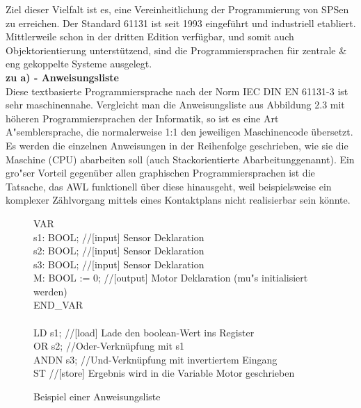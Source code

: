	Ziel dieser Vielfalt ist es, eine Vereinheitlichung der Programmierung von SPSen zu erreichen. Der Standard 61131 ist seit 1993 eingeführt und industriell etabliert. Mittlerweile schon in der dritten Edition verfügbar, und somit auch Objektorientierung unterstützend, sind die Programmiersprachen für zentrale \& eng gekoppelte Systeme ausgelegt.\\
	
	\textbf{zu a) - Anweisungsliste}\\
	
	Diese textbasierte Programmiersprache nach der Norm IEC DIN EN 61131-3 ist sehr maschinennahe. Vergleicht man die Anweisungsliste aus Abbildung 2.3 mit höheren Programmiersprachen der Informatik, so ist es eine Art A"semblersprache, die normalerweise 1:1 den jeweiligen Maschinencode übersetzt. Es werden die einzelnen Anweisungen in der Reihenfolge geschrieben, wie sie die Maschine (CPU) abarbeiten soll (auch \glqq Stackorientierte Abarbeitung\grqq \space genannt). Ein gro"ser Vorteil gegenüber allen graphischen Programmiersprachen ist die Tatsache, das AWL funktionell über diese hinausgeht, weil beispielsweise ein komplexer Zählvorgang mittels eines Kontaktplans nicht realisierbar sein könnte.	\cite{spslehrgang_struktur, egroetsch_sps}\\

	\begin{figure}[h!]
		\begin{framed}
			VAR\\
			s1: BOOL; \color{gray}//[input] Sensor Deklaration\\ \color{black}
			s2: BOOL; \color{gray}//[input] Sensor Deklaration\\ \color{black}
			s3: BOOL; \color{gray}//[input] Sensor Deklaration\\ \color{black}
			M: BOOL := 0; \color{gray}//[output] Motor Deklaration (mu"s initialisiert werden)\\ \color{black}
			END\_VAR\\\\
			LD s1; \color{gray}//[load] Lade den boolean-Wert ins Register\\ \color{black}
			OR s2; \color{gray}//Oder-Verknüpfung mit s1\\ \color{black}
			ANDN s3; \color{gray}//Und-Verknüpfung mit invertiertem Eingang\\ \color{black}
			ST \color{gray}//[store] Ergebnis wird in die Variable Motor geschrieben\\
		\end{framed}
		\caption{Beispiel einer Anweisungsliste}
	\end{figure}
	
